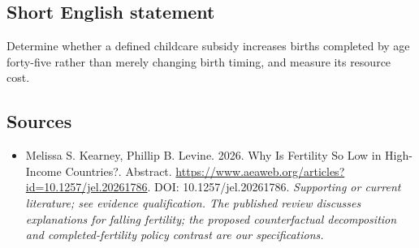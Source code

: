 \documentclass[11pt]{article}
\begin{document}
\subsection{Short English statement}
Determine whether a defined childcare subsidy increases births completed by age forty-five rather than merely changing birth timing, and measure its resource cost.

\subsection{Sources}
\begin{itemize}\raggedright
\item[\textnormal{[S1]}]\hypertarget{source:30007738:1}{} Melissa S. Kearney, Phillip B. Levine. 2026. Why Is Fertility So Low in High-Income Countries?. Abstract.
\url{https://www.aeaweb.org/articles?id=10.1257/jel.20261786}.
DOI: 10.1257/jel.20261786.
{\small\textit{Supporting or current literature; see evidence qualification. The published review discusses explanations for falling fertility; the proposed counterfactual decomposition and completed-fertility policy contrast are our specifications.}}
\end{itemize}
\end{document}
